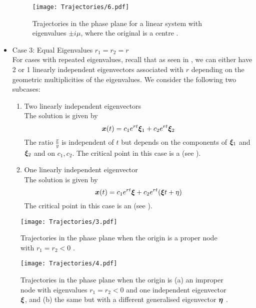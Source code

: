 \begin{itemize}
	\begin{figure}[H]
		\centering
		\texttt{[image: Trajectories/6.pdf]}
		\caption{Trajectories in the phase plane for a linear system with eigenvalues $\pm i\mu$, where the original is a centre \cite[Figure 9.1.6(a)]{boyce}.}
		\label{fig:trajectory6}
	\end{figure}
	
	\item Case 3: Equal Eigenvalues $r_1 = r_2 = r$\\
	For cases with repeated eigenvalues, recall that as seen in , we can either have 2 or 1 linearly independent eigenvectors associated with $r$ depending on the geometric multiplicities of the eigenvalues. We consider the following two subcases:
	\begin{enumerate}[label=(\roman*)]
		\item Two linearly independent eigenvectors \\ 
		The solution is given by 
		\[
		\bm{x}(t) = c_1 e^{rt} \bm{\xi}_1 + c_2 e^{rt} \bm{\xi}_2
		\]
		The ratio $\frac{x}{y}$ is independent of $t$ but depends on the components of $\bm{\xi}_1$ and $\bm{\xi}_2$ and on $c_1, c_2$. The critical point in this case is a  (see ).
		
		\item One linearly independent eigenvector \\
		The solution is given by 
		\[
		\bm{x}(t) = c_1 e^{rt} \bm{\xi} + c_2 e^{rt} (\bm{\xi} t + \eta)
		\] The critical point in this case is an  (see ).
	\end{enumerate}
\end{itemize}

\begin{figure}[H]
	\centering
	\texttt{[image: Trajectories/3.pdf]}
	\caption{Trajectories in the phase plane when the origin is a proper node with $r_1 = r_2 < 0$ \cite[Figure 9.1.3(a)]{boyce}.}
	\label{fig:trajectory3}
\end{figure}

\begin{figure}[H]
	\centering
	\texttt{[image: Trajectories/4.pdf]}
	\caption{Trajectories in the phase plane when the origin is (a) an improper node with eigenvalues $r_1 = r_2 < 0$ and one independent eigenvector $\bm{\xi}$, and (b) the same but with a different generalised eigenvector $\bm{\eta}$ \cite[Figure 9.1.4]{boyce}.}
	\label{fig:trajectory4}
\end{figure}


